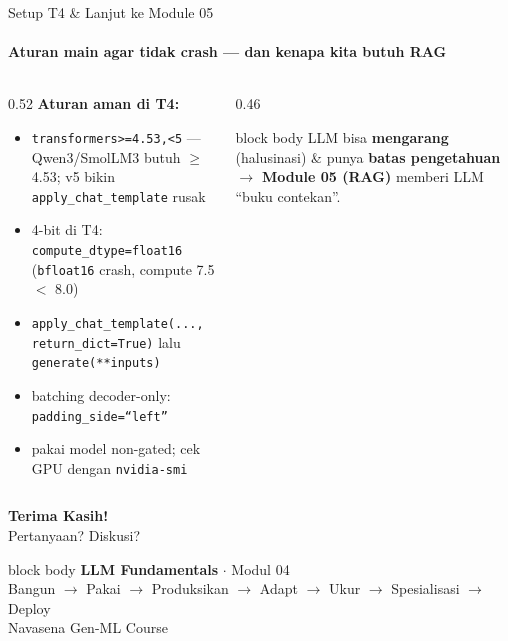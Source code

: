 \documentclass[aspectratio=169,t]{beamer}
\begin{document}
\begin{frame}{Setup T4 \& Lanjut ke Module 05}
  \framesubtitle{Aturan main agar tidak crash --- dan kenapa kita butuh RAG}
  \begin{columns}[T]
    \begin{column}{0.52\textwidth}
      \footnotesize
      \textbf{Aturan aman di T4:}
      \begin{itemize}
        \item[\textcolor{nvgreen}{\checkmark}] \texttt{transformers>=4.53,<5} --- Qwen3/SmolLM3 butuh $\geq$4.53; v5 bikin \texttt{apply\_chat\_template} rusak
        \item[\textcolor{nvgreen}{\checkmark}] 4-bit di T4: \texttt{compute\_dtype=float16} (\textcolor{nvred}{\texttt{bfloat16} crash}, compute 7.5 $<$ 8.0)
        \item[\textcolor{nvgreen}{\checkmark}] \texttt{apply\_chat\_template(..., return\_dict=True)} lalu \texttt{generate(**inputs)}
        \item[\textcolor{nvgreen}{\checkmark}] batching decoder-only: \texttt{padding\_side=``left''}
        \item[\textcolor{nvgreen}{\checkmark}] pakai model non-gated; cek GPU dengan \texttt{nvidia-smi}
      \end{itemize}
    \end{column}
    \begin{column}{0.46\textwidth}
      \begin{beamercolorbox}[rounded=true,shadow=false,sep=6pt]{block body}
        \centering\small\color{nvlightgreen}
        LLM bisa \textbf{mengarang} (halusinasi) \& punya \textbf{batas pengetahuan} $\to$ \textbf{Module 05 (RAG)} memberi LLM ``buku contekan''.
      \end{beamercolorbox}
    \end{column}
  \end{columns}
\end{frame}

\begin{frame}[plain]
  \vspace{2cm}
  \begin{center}
    {\color{nvgreen}\Huge\bfseries Terima Kasih!}\\[1.5em]
    {\color{nvgray}\Large Pertanyaan? Diskusi?}\\[2em]
    \begin{beamercolorbox}[rounded=true,shadow=false,sep=8pt,wd=10cm]{block body}
      \centering\color{white}
      \textbf{LLM Fundamentals} \quad $\cdot$ \quad Modul 04 \\
      Bangun $\to$ Pakai $\to$ Produksikan $\to$ Adapt $\to$ Ukur $\to$ Spesialisasi $\to$ Deploy \\
      Navasena Gen-ML Course
    \end{beamercolorbox}
  \end{center}
\end{frame}
\end{document}
